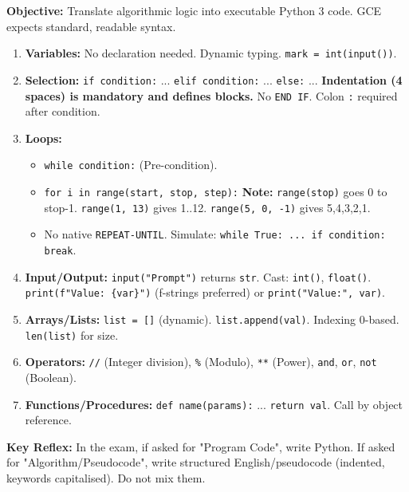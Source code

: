 \documentclass[11pt]{article}
\begin{document}
\begin{methode}
\textbf{Objective:} Translate algorithmic logic into executable Python 3 code. GCE expects standard, readable syntax.
\begin{enumerate}
    \item \textbf{Variables:} No declaration needed. Dynamic typing. \texttt{mark = int(input())}.
    \item \textbf{Selection:} \texttt{if condition:} ... \texttt{elif condition:} ... \texttt{else:} ... \textbf{Indentation (4 spaces) is mandatory and defines blocks.} No \texttt{END IF}. Colon \texttt{:} required after condition.
    \item \textbf{Loops:}
        \begin{itemize}
            \item \texttt{while condition:} (Pre-condition).
            \item \texttt{for i in range(start, stop, step):} \textbf{Note:} \texttt{range(stop)} goes 0 to stop-1. \texttt{range(1, 13)} gives 1..12. \texttt{range(5, 0, -1)} gives 5,4,3,2,1.
            \item No native \texttt{REPEAT-UNTIL}. Simulate: \texttt{while True: ... if condition: break}.
        \end{itemize}
    \item \textbf{Input/Output:} \texttt{input("Prompt")} returns \texttt{str}. Cast: \texttt{int()}, \texttt{float()}. \texttt{print(f"Value: \{var\}")} (f-strings preferred) or \texttt{print("Value:", var)}.
    \item \textbf{Arrays/Lists:} \texttt{list = []} (dynamic). \texttt{list.append(val)}. Indexing 0-based. \texttt{len(list)} for size.
    \item \textbf{Operators:} \texttt{//} (Integer division), \texttt{\%} (Modulo), \texttt{**} (Power), \texttt{and}, \texttt{or}, \texttt{not} (Boolean).
    \item \textbf{Functions/Procedures:} \texttt{def name(params):} ... \texttt{return val}. Call by object reference.
\end{enumerate}
\textbf{Key Reflex:} In the exam, if asked for "Program Code", write Python. If asked for "Algorithm/Pseudocode", write structured English/pseudocode (indented, keywords capitalised). Do not mix them.
\end{methode}
\end{document}
